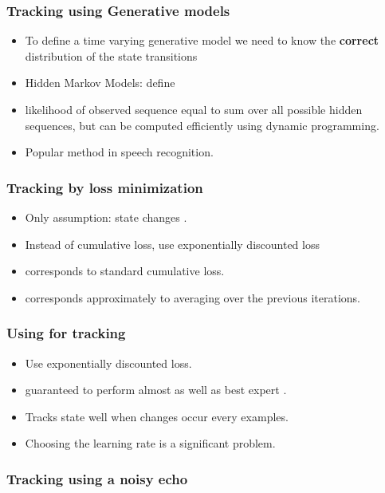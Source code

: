 \documentclass{beamer}
\begin{document}
\begin{frame}
\frametitle{Tracking using Generative models}
\begin{itemize}
\item To define a time varying generative model we need to know the
  {\bf correct} distribution of the state transitions
\item Hidden Markov Models: define 
\item likelihood of observed sequence equal to sum over all possible
  hidden sequences, but can be computed efficiently using dynamic
  programming. 
\item Popular method in speech recognition.
\end{itemize}
\end{frame}

\begin{frame}
\frametitle{Tracking by loss minimization}
\begin{itemize}
\item Only assumption: state changes .
\item Instead of cumulative loss, use exponentially discounted loss
\item {} corresponds to standard cumulative loss.
\item {} corresponds approximately to averaging over the
  previous  iterations. 
\end{itemize}
\end{frame}

\begin{frame}
\frametitle{Using \ouralg for tracking}
\begin{itemize}
\item Use exponentially discounted loss.
\item \ouralg guaranteed to perform almost as well as best expert
  .
\item Tracks state well when changes occur every 
  examples.
\item Choosing the learning rate \redEq{\eta} is a significant problem.
\end{itemize}
\end{frame}

\begin{frame}
\frametitle{Tracking using a noisy echo}
\end{frame}
\end{document}

